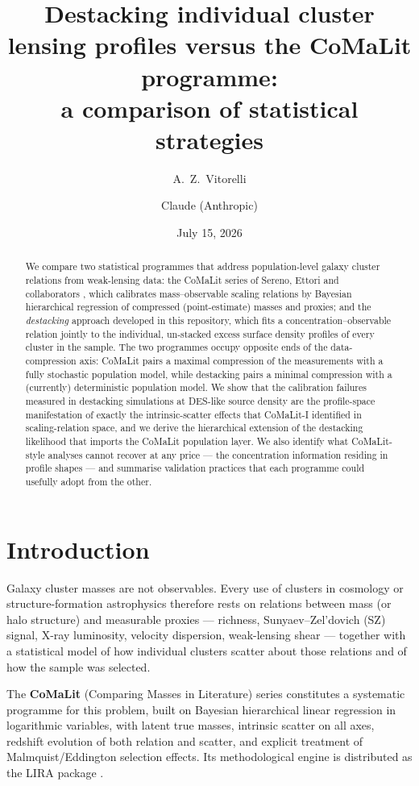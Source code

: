 \documentclass[11pt,a4paper]{article}
\title{Destacking individual cluster lensing profiles versus the CoMaLit
programme:\\ a comparison of statistical strategies}
\author{A.~Z.~Vitorelli \and Claude (Anthropic)}
\date{July 15, 2026}
\begin{document}
\maketitle

\begin{abstract}
We compare two statistical programmes that address population-level galaxy
cluster relations from weak-lensing data: the CoMaLit series of Sereno,
Ettori and collaborators
\cite{comalit1,comalit2,comalit3,comalit4,comalit5,comalit6}, which
calibrates mass--observable scaling relations by Bayesian hierarchical
regression of compressed (point-estimate) masses and proxies; and the
\emph{destacking} approach developed in this repository, which fits a
concentration--observable relation jointly to the individual, un-stacked
excess surface density profiles of every cluster in the sample. The two
programmes occupy opposite ends of the data-compression axis: CoMaLit pairs
a maximal compression of the measurements with a fully stochastic population
model, while destacking pairs a minimal compression with a (currently)
deterministic population model. We show that the calibration failures
measured in destacking simulations at DES-like source density are the
profile-space manifestation of exactly the intrinsic-scatter effects that
CoMaLit-I identified in scaling-relation space, and we derive the
hierarchical extension of the destacking likelihood that imports the CoMaLit
population layer. We also identify what CoMaLit-style analyses cannot
recover at any price --- the concentration information residing in profile
shapes --- and summarise validation practices that each programme could
usefully adopt from the other.
\end{abstract}

\section{Introduction}

Galaxy cluster masses are not observables. Every use of clusters in
cosmology or structure-formation astrophysics therefore rests on relations
between mass (or halo structure) and measurable proxies --- richness,
Sunyaev--Zel'dovich (SZ) signal, X-ray luminosity, velocity dispersion,
weak-lensing shear --- together with a statistical model of how individual
clusters scatter about those relations and of how the sample was selected.

The \textbf{CoMaLit} (Comparing Masses in Literature) series
\cite{comalit1,comalit2,comalit3,comalit4,comalit5,comalit6} constitutes a
systematic programme for this problem, built on Bayesian hierarchical linear
regression in logarithmic variables, with latent true masses, intrinsic
scatter on all axes, redshift evolution of both relation and scatter, and
explicit treatment of Malmquist/Eddington selection effects. Its
methodological engine is distributed as the LIRA package \cite{lira}.
\end{document}

